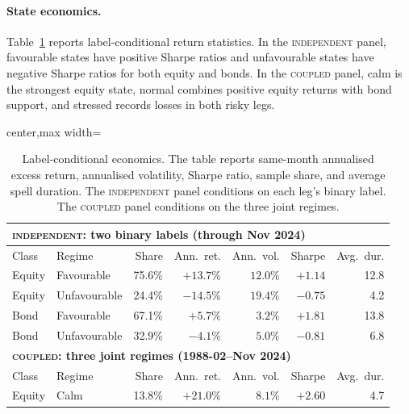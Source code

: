 ﻿\documentclass[10pt]{article}
\newcommand{\Acoup}{\textsc{coupled}}
\newcommand{\Bindep}{\textsc{independent}}
\begin{document}
\paragraph{State economics.}
Table~\ref{tab:state-economics} reports label-conditional return statistics. In the
\Bindep{} panel, favourable states have positive Sharpe ratios and unfavourable states have
negative Sharpe ratios for both equity and bonds. In the \Acoup{} panel, calm is the strongest
equity state, normal combines positive equity returns with bond support, and stressed records
losses in both risky legs.

\begin{table}[H]
    \centering
    \caption{Label-conditional economics. The table reports same-month annualised excess return,
        annualised volatility, Sharpe ratio, sample share, and average spell duration. The
        \Bindep{} panel conditions on each leg's binary label. The \Acoup{} panel conditions on the
        three joint regimes.}
    \label{tab:state-economics}
    \small
    \begin{adjustbox}{center,max width=\textwidth}
        \begin{tabular}{@{}llrrrrr@{}}
            \toprule
            \multicolumn{7}{l}{\textbf{\Bindep{}: two binary labels (through Nov 2024)}}                  \\
            \midrule
            Class  & Regime       & Share            & Ann.\ ret. & Ann.\ vol. & Sharpe  & Avg.\ dur.     \\
            \midrule
            Equity & Favourable   & 75.6\%           & $+13.7\%$  & $12.0\%$   & $+1.14$ & 12.8           \\
            Equity & Unfavourable & 24.4\%           & $-14.5\%$  & $19.4\%$   & $-0.75$ & \phantom{0}4.2 \\
            Bond   & Favourable   & 67.1\%           & $+5.7\%$   & $3.2\%$    & $+1.81$ & 13.8           \\
            Bond   & Unfavourable & 32.9\%           & $-4.1\%$   & $5.0\%$    & $-0.81$ & \phantom{0}6.8 \\
            \midrule
            \multicolumn{7}{l}{\textbf{\Acoup{}: three joint regimes (1988-02--Nov 2024)}}                \\
            \midrule
            Class  & Regime       & Share            & Ann.\ ret. & Ann.\ vol. & Sharpe  & Avg.\ dur.     \\
            \midrule
            Equity & Calm         & 13.8\%           & $+21.0\%$  & $8.1\%$    & $+2.60$ & \phantom{0}4.7 \\

\end{tabular}
\end{adjustbox}
\end{table}
\end{document}
